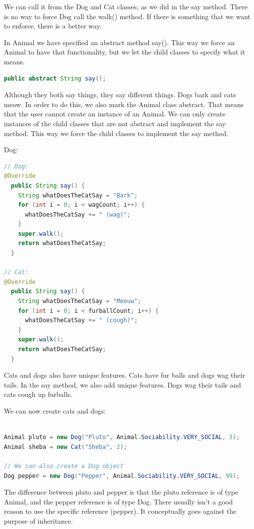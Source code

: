 We can call it from the Dog and Cat classes, as we did in the say method. There is no way to force Dog call the walk() method. If there is something that we want to enforce, there is a better way.

In Animal we have specified an abstract method say(). This way we force an Animal to have that functionality, but we let the child classes to specify what it means. 

\begin{lstlisting}[language=Java]
 public abstract String say();
\end{lstlisting}

Although they both say things, they say different things. Dogs bark and cats meow.
In order to do this, we also mark the Animal class abstract. That means that the user cannot create an instance of an Animal. We can only create instances of the child classes that are not abstract and implement the say method. This way we force the child classes to implement the say method.

Dog:
\begin{lstlisting}[language=Java]
// Dog:
@Override
  public String say() {
    String whatDoesTheCatSay = "Bark";
    for (int i = 0; i < wagCount; i++) {
      whatDoesTheCatSay += " (wag)";
    }
	super.walk();
    return whatDoesTheCatSay;
  }
  
// Cat:
@Override
  public String say() {
    String whatDoesTheCatSay = "Meouw";
    for (int i = 0; i < furballCount; i++) {
      whatDoesTheCatSay += " (cough)";
    }
    super.walk();
    return whatDoesTheCatSay;
  }
\end{lstlisting}

Cats and dogs also have unique features.  Cats have fur balls and dogs wag their tails. In the say method, we also add unique features. Dogs wag their tails and cats cough up furballs.

We can now create cats and dogs:
\begin{lstlisting}[language=Java]

Animal pluto = new Dog("Pluto", Animal.Sociability.VERY_SOCIAL, 3);
Animal sheba = new Cat("Sheba", 2);

// We can also create a Dog object
Dog pepper = new Dog("Pepper", Animal.Sociability.VERY_SOCIAL, 99);

\end{lstlisting}

The difference between pluto and pepper is that the pluto reference is of type Animal, and the pepper reference is of type Dog. There usually isn't a good reason to use the specific reference (pepper). It conceptually goes against the purpose of inheritance.

